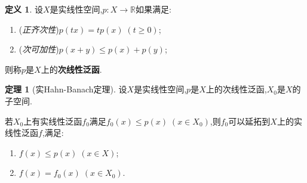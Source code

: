 \documentclass{ctexart}
\theoremstyle{definition}
\newtheorem{definition}{定义}
\newtheorem{theorem}{定理}
\theoremstyle{remark}
\begin{document}
	\begin{definition}
		设$X$是实线性空间,$p:X\to\mathbb{R}$如果满足:
		\begin{enumerate}
			\item (\textit{正齐次性})$p(tx)=tp(x)\;(t\ge 0)$;
			\item (\textit{次可加性})$p(x+y)\le p(x)+p(y)$;
		\end{enumerate}
		则称$p$是$X$上的\textbf{次线性泛函}.
	\end{definition}
	\begin{theorem}[实Hahn-Banach定理]
		设$X$是实线性空间,$p$是$X$上的次线性泛函,$X_0$是$X$的子空间.
		
		若$X_0$上有实线性泛函$f_0$满足$f_0(x)\le p(x)\;(x\in X_0)$,则$f_0$可以延拓到$X$上的实线性泛函$f$,满足:
		\begin{enumerate}
			\item $f(x)\le p(x)\;(x\in X)$;
			\item $f(x)=f_0(x)\;(x\in X_0)$.
		\end{enumerate}
	\end{theorem}
\end{document}
